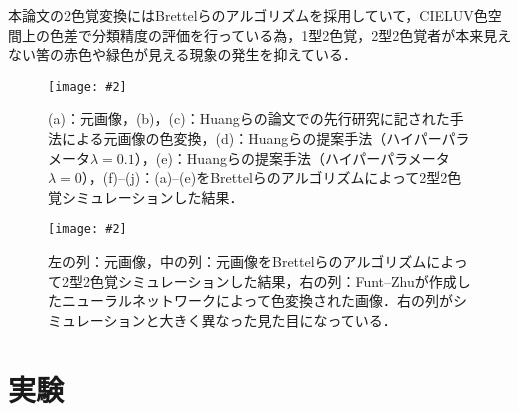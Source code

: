 \documentclass[uplatex,paper=a4,fontsize=4.0truemm,jafontsize=4.0truemm,head_space=30.0truemm,foot_space=30.0truemm,baselineskip=8.0truemm,line_length=40zw,gutter=25.0truemm,oneside,openany,fleqn,hanging_panctuation,open_bracket_pos=nibu_tentsuki,dvipdfmx,jis2004,book,titlepage]{jlreq}
\theoremstyle{mystyle}
\newcommand{\captiondot}[1]{\caption{#1．}}
\newcommand{\figureinput}[4]{\begin{figure}[btp]\centering\texttt{[image: \#2]}\captiondot{#3}\label{fig:#4}\end{figure}}
\newcommand{\mathdisplaystyle}[1]{\(\displaystyle{#1}\)}
\begin{document}
		本論文の2色覚変換にはBrettelらのアルゴリズムを採用していて，CIELUV色空間上の色差で分類精度の評価を行っている為，1型2色覚，2型2色覚者が本来見えない筈の赤色や緑色が見える現象の発生を抑えている．
		\figureinput{width=\linewidth}{D:/a/figs/flowers.png}{(a)：元画像，(b)，(c)：Huangらの論文での先行研究に記された手法による元画像の色変換，(d)：Huangらの提案手法（ハイパーパラメータ\mathdisplaystyle{\lambda=0.1}），(e)：Huangらの提案手法（ハイパーパラメータ\mathdisplaystyle{\lambda=0}），(f)--(j)：(a)--(e)をBrettelらのアルゴリズムによって2型2色覚シミュレーションした結果}{flowers}
		\figureinput{width=7.5truecm}{D:/a/figs/LS.png}{左の列：元画像，中の列：元画像をBrettelらのアルゴリズムによって2型2色覚シミュレーションした結果，右の列：Funt--Zhuが作成したニューラルネットワークによって色変換された画像．右の列がシミュレーションと大きく異なった見た目になっている}{LS}
	\chapter{実験}
\end{document}
